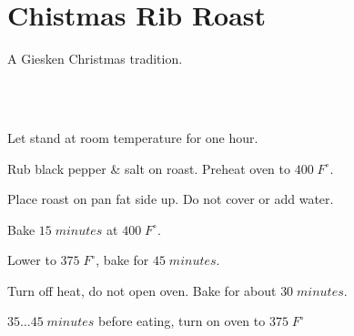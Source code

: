 \section{Chistmas Rib Roast}
\begin{recipestats}[
	servings=$\approx 1\;person \; / \; 1 \; lb$,
	preptime=1 hour 15 minutes,
	bakingtime=2 hours 15 minutes,
	source=Ralph Nelson (Fa),
	]
\end{recipestats}


\begin{recipeabstract}
	A Giesken Christmas tradition.
\end{recipeabstract}

\begin{ingredientcolumns}[1]
	\begin{ingredientblock}
		\\
		\\
	\end{ingredientblock}
\end{ingredientcolumns}

\begin{preparation}
\item Let stand at room temperature for one hour.

\item Rub black pepper \& salt on roast. Preheat oven to $400\; F^\circ$.

\item Place roast on pan fat side up. Do not cover or add water.

\item Bake $15\; minutes$ at $400\; F^\circ$.

\item Lower to $375\; F^\circ$, bake for $45\; minutes$.

\item Turn off heat, do not open oven. Bake for about $30\;minutes$.

\item $35...45\; minutes$ before eating, turn on oven to $375\;F^\circ$
\end{preparation}

\recipeend